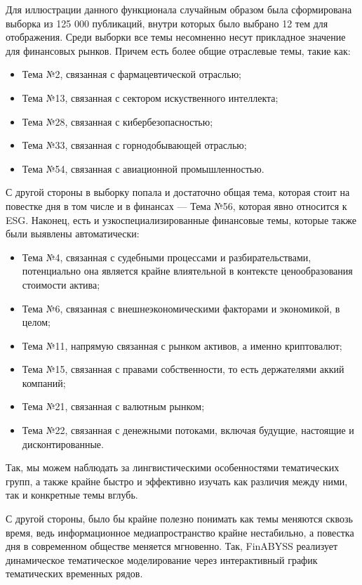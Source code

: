 Для иллюстрации данного функционала случайным образом была сформирована выборка из
125 000 публикаций, внутри которых было выбрано 12 тем для отображения. Среди выборки
все темы несомненно несут прикладное значение для финансовых рынков. Причем есть
более общие отраслевые темы, такие как:

\begin{itemize}
    \item Тема №2, связанная с фармацевтической отраслью;
    \item Тема №13, связанная с сектором искуственного интеллекта;
    \item Тема №28, связанная с кибербезопасностью;
    \item Тема №33, связанная с горнодобывающей отраслью;
    \item Тема №54, связанная с авиационной промышленностью.
\end{itemize}

С другой стороны в выборку попала и достаточно общая тема, которая стоит на повестке дня в том числе и в финансах ---
Тема №56, которая явно относится к ESG. Наконец, есть и узкоспециализированные финансовые темы,
которые также были выявлены автоматически:

\begin{itemize}
    \item Тема №4, связанная с судебными процессами и разбирательствами, потенциально она
    является крайне влиятельной в контексте ценообразования стоимости актива;
    \item Тема №6, связанная с внешнеэкономическими факторами и экономикой, в целом;
    \item Тема №11, напрямую связанная с рынком активов, а именно криптовалют;
    \item Тема №15, связанная с правами собственности, то есть держателями аккий компаний;
    \item Тема №21, связанная с валютным рынком;
    \item Тема №22, связанная с денежными потоками, включая будущие, настоящие и дисконтированные.
\end{itemize}

Так, мы можем наблюдать за лингвистическими особенностями тематических групп,
а также крайне быстро и эффективно изучать как различия между ними, так и конкретные темы вглубь.

С другой стороны, было бы крайне полезно понимать как темы меняются сквозь время, ведь информационное медиапространство
крайне нестабильно, а повестка дня в современном обществе меняется мгновенно. Так, FinABYSS реализует
динамическое тематическое моделирование через интерактивный график тематических временных рядов.

